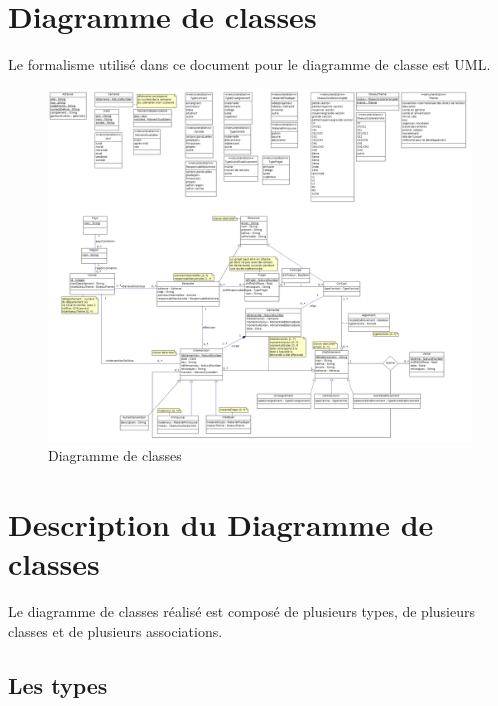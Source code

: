 
\newpage

\section*{}

\section{Diagramme de classes}

Le formalisme utilisé dans ce document pour le diagramme de classe est UML.

\begin{landscape}
\begin{figure}
	\centering
	\includegraphics[scale=0.3]{images/diagrammeDeClasses.png}
	\caption{\label{modele}Diagramme de classes}
\end{figure}
\end{landscape}

\section{Description du Diagramme de classes}

Le diagramme de classes réalisé est composé de plusieurs types, de plusieurs classes et de plusieurs associations. \\ 

\subsection{Les types}

